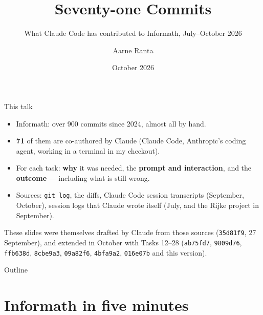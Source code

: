 \documentclass[10pt,aspectratio=169]{beamer}
\title{Seventy-one Commits}
\subtitle{What Claude Code has contributed to Informath, July--October 2026}
\author{Aarne Ranta}
\date{October 2026}
\newcommand{\commit}[1]{\texttt{\footnotesize #1}}
\begin{document}
\maketitle

\begin{frame}{This talk}
  \begin{itemize}
    \item Informath: over 900 commits since 2024, almost all by hand.
    \item \textbf{71} of them are co-authored by Claude (Claude Code, Anthropic's
          coding agent, working in a terminal in my checkout).
    \item For each task: \textbf{why} it was needed, the \textbf{prompt and
          interaction}, and the \textbf{outcome} --- including what is still wrong.
    \item Sources: \texttt{git log}, the diffs, Claude Code session transcripts
          (September, October), session logs that Claude wrote itself
          (July, and the Rijke project in September).
  \end{itemize}

  \vspace{0.5em}
  \small
  These slides were themselves drafted by Claude from those sources
  (\commit{35d81f9}, 27 September), and extended in October with Tasks 12--28
  (\commit{ab75fd7}, \commit{9809d76}, \commit{ffb638d}, \commit{8cbe9a3},
  \commit{09a82f6}, \commit{4bfa9a2}, \commit{016e07b} and this version).
\end{frame}

\begin{frame}{Outline}
  \small\tableofcontents
\end{frame}

\section{Informath in five minutes}
\end{document}
